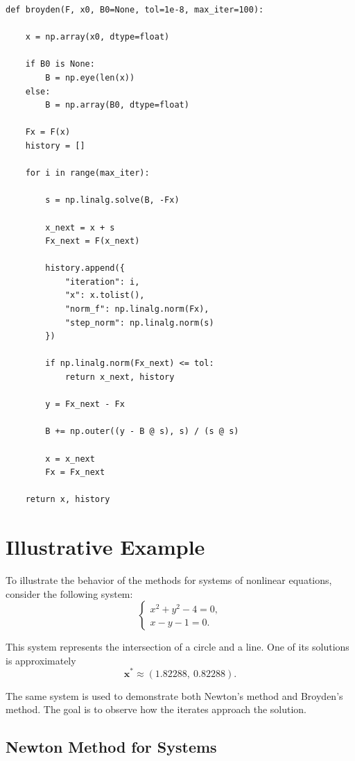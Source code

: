 \begin{lstlisting}
def broyden(F, x0, B0=None, tol=1e-8, max_iter=100):

    x = np.array(x0, dtype=float)

    if B0 is None:
        B = np.eye(len(x))
    else:
        B = np.array(B0, dtype=float)

    Fx = F(x)
    history = []

    for i in range(max_iter):

        s = np.linalg.solve(B, -Fx)

        x_next = x + s
        Fx_next = F(x_next)

        history.append({
            "iteration": i,
            "x": x.tolist(),
            "norm_f": np.linalg.norm(Fx),
            "step_norm": np.linalg.norm(s)
        })

        if np.linalg.norm(Fx_next) <= tol:
            return x_next, history

        y = Fx_next - Fx

        B += np.outer((y - B @ s), s) / (s @ s)

        x = x_next
        Fx = Fx_next

    return x, history
\end{lstlisting}

\section{Illustrative Example}

To illustrate the behavior of the methods for systems of nonlinear equations, consider the following system:
\begin{equation}
\begin{cases}
x^2 + y^2 - 4 = 0, \\
x - y - 1 = 0.
\end{cases}
\end{equation}

This system represents the intersection of a circle and a line. One of its solutions is approximately
\[
\mathbf{x}^* \approx (1.82288,\ 0.82288).
\]

The same system is used to demonstrate both Newton's method and Broyden's method. The goal is to observe how the iterates approach the solution.

\subsection{Newton Method for Systems}

